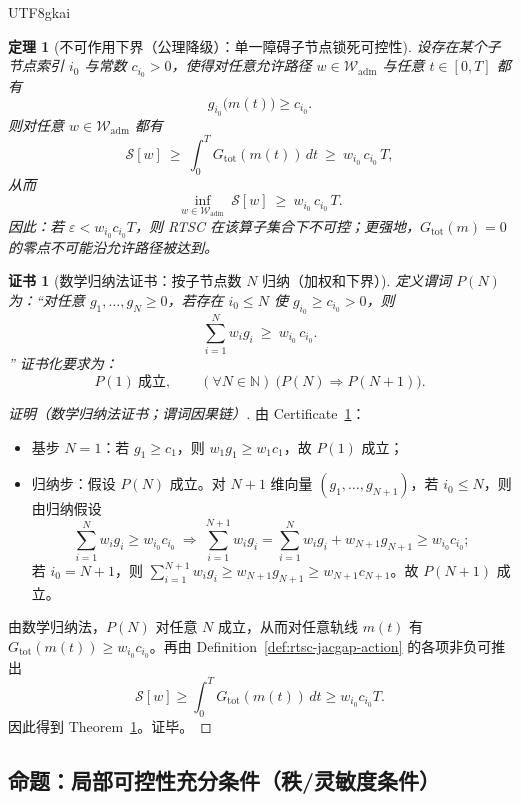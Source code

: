 \documentclass[12pt]{article}
\newtheorem{theorem}{定理}[section]
\newtheorem{certificate}{证书}[section]
\newcommand{\RTSC}{\textsf{RTSC}}
\begin{document}
\begin{CJK*}{UTF8}{gkai}
\begin{theorem}[不可作用下界（公理降级）：单一障碍子节点锁死可控性]
\label{thm:rtsc-jacgap-unactuated-lower-bound}
设存在某个子节点索引 $i_0$ 与常数 $c_{i_0}>0$，使得对任意允许路径 $w\in\mathcal{W}_{\mathrm{adm}}$ 与任意 $t\in[0,T]$ 都有
\[
g_{i_0}\bigl(m(t)\bigr)\ge c_{i_0}.
\]
则对任意 $w\in\mathcal{W}_{\mathrm{adm}}$ 都有
\[
\mathcal{S}[w]\ \ge\ \int_0^T G_{\mathrm{tot}}(m(t))\,dt\ \ge\ w_{i_0}\,c_{i_0}\,T,
\]
从而
\[
\inf_{w\in\mathcal{W}_{\mathrm{adm}}}\ \mathcal{S}[w]\ \ge\ w_{i_0}\,c_{i_0}\,T.
\]
因此：若 $\varepsilon < w_{i_0}c_{i_0}T$，则 \RTSC{} 在该算子集合下不可控；更强地，$G_{\mathrm{tot}}(m)=0$ 的零点不可能沿允许路径被达到。
\end{theorem}

\begin{certificate}[数学归纳法证书：按子节点数 $N$ 归纳（加权和下界）]
\label{cert:rtsc-jacgap-unactuated-induction}
定义谓词 $P(N)$ 为：“对任意 $g_1,\dots,g_N\ge 0$，若存在 $i_0\le N$ 使 $g_{i_0}\ge c_{i_0}>0$，则
\[
\sum_{i=1}^N w_i g_i\ \ge\ w_{i_0}\,c_{i_0}.
\]
” 证书化要求为：
\[
P(1)\ \text{成立},\qquad
(\forall N\in\mathbb{N})\ \bigl(P(N)\Rightarrow P(N+1)\bigr).
\]
\end{certificate}

\begin{proof}[证明（数学归纳法证书；谓词因果链）]
由 Certificate~\ref{cert:rtsc-jacgap-unactuated-induction}：
\begin{itemize}
  \item 基步 $N=1$：若 $g_1\ge c_1$，则 $w_1 g_1\ge w_1 c_1$，故 $P(1)$ 成立；
  \item 归纳步：假设 $P(N)$ 成立。对 $N+1$ 维向量 $(g_1,\dots,g_{N+1})$，若 $i_0\le N$，则由归纳假设
  \[
  \sum_{i=1}^{N} w_i g_i\ge w_{i_0}c_{i_0}\ \Rightarrow\ \sum_{i=1}^{N+1} w_i g_i=\sum_{i=1}^{N} w_i g_i+w_{N+1}g_{N+1}
    \ge w_{i_0}c_{i_0};
  \]
  若 $i_0=N+1$，则 $\sum_{i=1}^{N+1} w_i g_i\ge w_{N+1}g_{N+1}\ge w_{N+1}c_{N+1}$。故 $P(N+1)$ 成立。
\end{itemize}
由数学归纳法，$P(N)$ 对任意 $N$ 成立，从而对任意轨线 $m(t)$ 有 $G_{\mathrm{tot}}(m(t))\ge w_{i_0}c_{i_0}$。再由 Definition~\ref{def:rtsc-jacgap-action} 的各项非负可推出
\[
\mathcal{S}[w]\ge \int_0^T G_{\mathrm{tot}}(m(t))\,dt\ge w_{i_0}c_{i_0}T.
\]
因此得到 Theorem~\ref{thm:rtsc-jacgap-unactuated-lower-bound}。证毕。
\end{proof}

\subsection{命题：局部可控性充分条件（秩/灵敏度条件）}


\end{CJK*}
\end{document}
